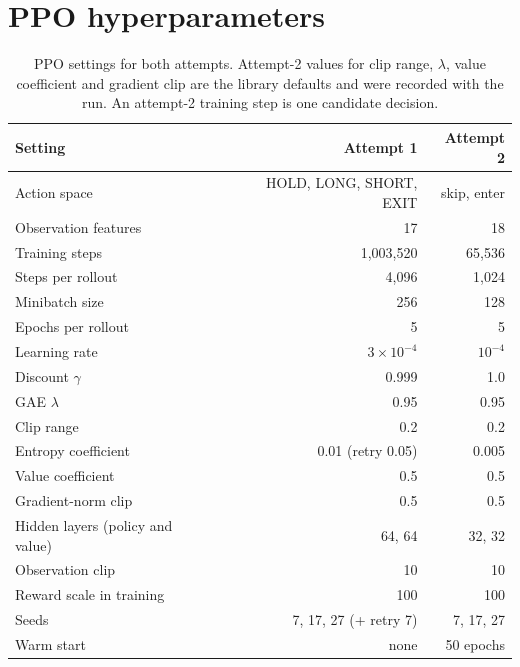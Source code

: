 \documentclass[12pt,a4paper]{article}
\begin{document}
\section{PPO hyperparameters}\label{app:hyper}
\begin{table}[H]
\centering
\caption{PPO settings for both attempts. Attempt-2 values for clip range, $\lambda$, value
coefficient and gradient clip are the library defaults and were recorded with the run. An
attempt-2 training step is one candidate decision.}
\label{tab:hyper}
\begin{tabular}{@{}lrr@{}}
\toprule
Setting & Attempt 1 & Attempt 2 \\
\midrule
Action space & HOLD, LONG, SHORT, EXIT & skip, enter \\
Observation features & 17 & 18 \\
Training steps & 1,003,520 & 65,536 \\
Steps per rollout & 4,096 & 1,024 \\
Minibatch size & 256 & 128 \\
Epochs per rollout & 5 & 5 \\
Learning rate & $3\times10^{-4}$ & $10^{-4}$ \\
Discount $\gamma$ & 0.999 & 1.0 \\
GAE $\lambda$ & 0.95 & 0.95 \\
Clip range & 0.2 & 0.2 \\
Entropy coefficient & 0.01 (retry 0.05) & 0.005 \\
Value coefficient & 0.5 & 0.5 \\
Gradient-norm clip & 0.5 & 0.5 \\
Hidden layers (policy and value) & 64, 64 & 32, 32 \\
Observation clip & 10 & 10 \\
Reward scale in training & 100 & 100 \\
Seeds & 7, 17, 27 (+ retry 7) & 7, 17, 27 \\
Warm start & none & 50 epochs \\
\bottomrule
\end{tabular}
\end{table}
\end{document}
